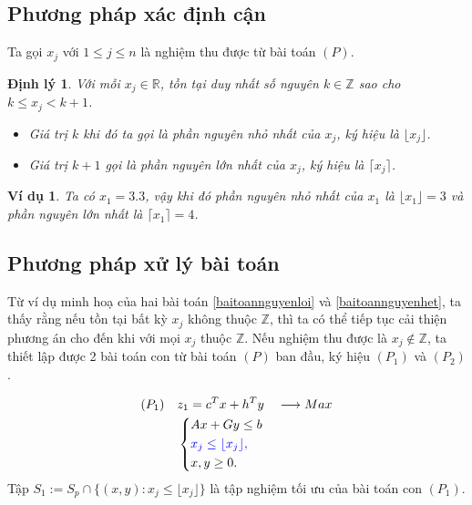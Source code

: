 \documentclass[12pt,a4paper]{report}
\newtheorem{dl}{Định lý}
\newtheorem{vd}{Ví dụ}
\begin{document}
\subsection*{Phương pháp xác định cận}
Ta gọi $x_j$ với $1 \leq j \leq n$ là nghiệm thu được từ bài toán $(P)$.
\begin{dl}\label{cmnguyen}
	\phantom{}
Với mỗi $x_j \in \mathbb{R}$, tồn tại duy nhất số nguyên $k \in \mathbb{Z}$ sao cho $k \leq x_j < k+1$.
\begin{itemize}
\item Giá trị $k$ khi đó ta gọi là phần nguyên nhỏ nhất của $x_j$, ký hiệu là $\lfloor x_j \rfloor$.
\item Giá trị $k+1$ gọi là phần nguyên lớn nhất của $x_j$, ký hiệu là $\lceil x_j \rceil$.
\end{itemize}
\end{dl}

\begin{vd}
Ta có $x_1=3.3$, vậy khi đó phần nguyên nhỏ nhất của $x_1$ là $\lfloor x_1 \rfloor = 3$ và phần nguyên lớn nhất là $\lceil x_1 \rceil =4$.
\end{vd}

\subsection*{Phương pháp xử lý bài toán}

Từ ví dụ minh hoạ của hai bài toán \eqref{baitoannguyenloi} và \eqref{baitoannguyenhet}, ta thấy rằng nếu tồn tại bất kỳ $x_j$ không thuộc $\mathbb{Z}$, thì ta có thể tiếp tục cải thiện phương án cho đến khi với mọi $x_j$ thuộc $\mathbb{Z}$. 
Nếu nghiệm thu được là $x_j \notin \mathbb{Z}$, ta thiết lập được 2 bài toán con từ bài toán $(P)$ ban đầu, ký hiệu $(P_1)$ và $(P_2)$.

\begin{equation}
    \begin{split}
    (P_1) \quad & z_1=c^Tx+h^Ty \quad \longrightarrow Max \\
                & \left\{\begin{split}
                    &Ax+Gy \leq  b \\
                    &\color{blue} x_j \leq \lfloor x_j \rfloor , \\
                    &x,y \geq 0.
                \end{split}\right.    
    \end{split}
\end{equation}
Tập $S_1:=S_p \cap \{ (x,y): x_j \leq \lfloor x_j \rfloor \}$ là tập nghiệm tối ưu của bài toán con $(P_1)$.
\end{document}

